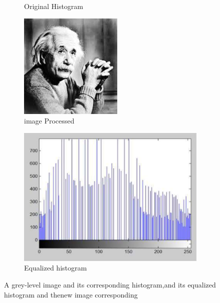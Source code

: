 \begin{figure}[h]
\begin{subfigure}[b]{0.5\textwidth}
                        \caption{Original Histogram}
                \end{subfigure}
                \hfill
                \begin{subfigure}[b]{0.3\textwidth}
                        \centering
                        \includegraphics[width=\textwidth]{chapiter1/figures/equa-processed-image.png}
                        \caption{image Processed}
                \end{subfigure}
                \hfill
                \begin{subfigure}[b]{0.5\textwidth}
                        \centering
                        \includegraphics[width=\textwidth]{chapiter1/figures/equa-original-hist.png}
                        \caption{Equalized histogram}
                \end{subfigure}
                \caption{A grey-level image and its corresponding histogram,and its equalized histogram and thenew image corresponding}
                \label{fig:figure1.13}
        \end{figure}

